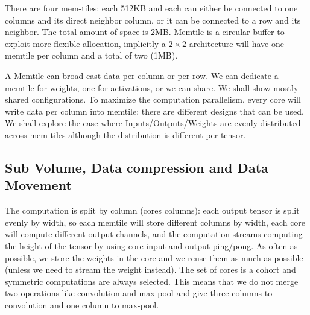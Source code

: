 \documentclass[sigconf]{acmart}
\begin{document}
There are four mem-tiles: each 512KB and each can either be connected
to one columns and its direct neighbor column, or it can be connected
to a row and its neighbor. The total amount of space is 2MB. Memtile
is a circular buffer to exploit more flexible allocation, implicitly a
$2 \times 2$ architecture will have one memtile per column and a total
of two (1MB).

A Memtile can broad-cast data per column or per row. We can dedicate a
memtile for weights, one for activations, or we can share. We shall
show mostly shared configurations. To maximize the computation
parallelism, every core will write data per column into memtile: there
are different designs that can be used. We shall explore the case
where Inputs/Outputs/Weights are evenly distributed across mem-tiles
although the distribution is different per tensor.
\begin{comment}
The DDR is connected with two channels to write into each mem-tile and
each mem-tile can use two channels to write into DDR. DDR and Mem-tile
communications are parallel.  The abstraction can be extended to more
complex connections (from $1\times 1$, $8\times 2$, to $8\times 8$ and
more rows of memtiles designed for larger chips). But $4\times 4$ is
representative for the AIE engines you will find in the next
generation of CPU+FPGA chips.
\end{comment}

\subsection{Sub Volume, Data compression and Data Movement}
The computation is split by column (cores columns): each output tensor
is split evenly by width, so each memtile will store different columns
by width, each core will compute different output channels, and the
computation streams computing the height of the tensor by using core
input and output ping/pong. As often as possible, we store the weights
in the core and we reuse them as much as possible (unless we need to
stream the weight instead). The set of cores is a cohort and symmetric
computations are always selected. This means that we do not merge two
operations like convolution and max-pool and give three columns to
convolution and one column to max-pool.
\end{document}

